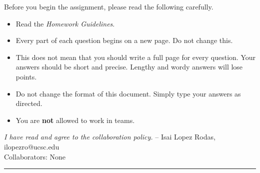 \documentclass[11pt]{article}
\begin{document}
\noindent
Before you begin the assignment, please read the following carefully.
\begin{itemize}
    \item Read the \emph{Homework Guidelines}.
    \item Every part of each question begins on a new page. Do not change this.
    \item This does not mean that you should write a full page for every question. Your answers should be short and precise. Lengthy and wordy answers will lose points.
    \item Do not change the format of this document. Simply type your answers as directed.
    \item You are \textbf{not} allowed to work in teams.
\end{itemize}
\emph{I have read and agree to the collaboration policy.}  -- Isai Lopez Rodas, ilopezro@ucsc.edu
\\
Collaborators: None %
\\
\hrule
\end{document}
